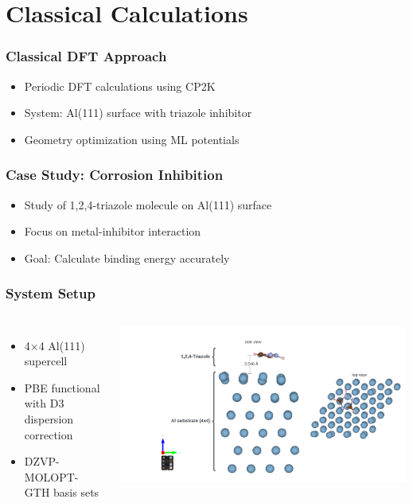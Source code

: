 \section{Classical Calculations}

\begin{frame}
\frametitle{Classical DFT Approach}
\begin{itemize}
    \item Periodic DFT calculations using CP2K
    \item System: Al(111) surface with triazole inhibitor
    \item Geometry optimization using ML potentials
\end{itemize}
\end{frame}

\begin{frame}
\frametitle{Case Study: Corrosion Inhibition}
\begin{itemize}
    \item Study of 1,2,4-triazole molecule on Al(111) surface
    \item Focus on metal-inhibitor interaction
    \item Goal: Calculate binding energy accurately
\end{itemize}
\end{frame}

\begin{frame}
\frametitle{System Setup}
\begin{columns}
\begin{itemize}
    \item 4×4 Al(111) supercell
    \item PBE functional with D3 dispersion correction
    \item DZVP-MOLOPT-GTH basis sets
\end{itemize}
\includegraphics[width=\textwidth]{../../../content/img/workflow_viz1.png}
\end{columns}
\end{frame}

